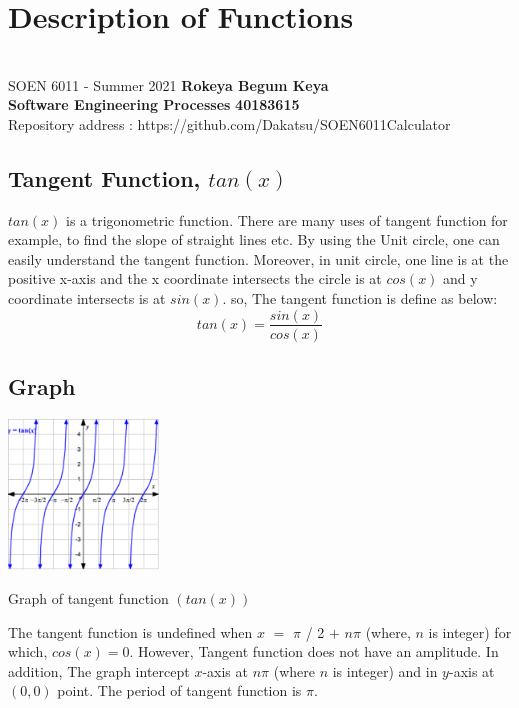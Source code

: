 \documentclass[letterpaper, 11pt]{report}
\begin{document}
\section*{Description of Functions}
\section*{}
\normalsize {SOEN 6011 - Summer 2021} \hfill \textbf{Rokeya Begum Keya} \\
\textbf{ Software Engineering Processes}  \hfill \textbf{40183615} \\
\hfill Repository address : https://github.com/Dakatsu/SOEN6011Calculator
\\
 \subsection*{ Tangent Function, $tan(x)$ } 
 
 \normalsize{ \cite{test1} $tan(x)$ is a trigonometric function. There are many uses of tangent function for example, to find the slope of straight lines etc. By using the Unit circle, one can easily understand the tangent function. Moreover, in unit circle, one line is at the positive x-axis and the x coordinate intersects the circle is at $cos(x)$ and y coordinate intersects is at $sin(x)$. so, The tangent function is define as below: \[tan(x) = \frac{sin(x)}{cos(x)}\]
 }
 
 \subsection*{Graph}
 \begin{center}
\includegraphics[width= 4cm]{tan}
\end{center}
\begin{center}
Graph of tangent function $ (tan(x))$\end{center}
 \normalsize{ \cite{test1} The tangent function is undefined when $x$ $=$ $\pi$ / 2 $+$ $n \pi$ (where, $n$ is integer) for which, $cos(x) = 0$. However, Tangent function does not have an amplitude. In addition, The graph intercept $x$-axis at $n\pi$ (where $n$ is integer) and in $y$-axis at $(0,0)$ point. The period of tangent function is $\pi$.
 }
 \\
\end{document}
